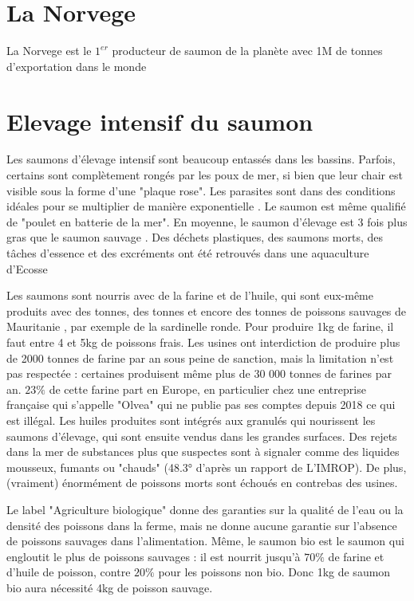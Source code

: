 \documentclass{article}
\begin{document}
\section{La Norvege}
La Norvege est le $1^{er}$ producteur de saumon de la planète avec 1M de tonnes d'exportation dans le monde

\section{Elevage intensif du saumon}
Les saumons d'élevage intensif sont beaucoup entassés dans les bassins. Parfois, certains sont complètement rongés par les poux de mer, si bien que leur chair est visible sous la forme d'une "plaque rose".
Les parasites sont dans des conditions idéales pour se multiplier de manière exponentielle \cite{FRANCE24}. Le saumon est même qualifié de "poulet en batterie de la mer".
En moyenne, le saumon d'élevage est 3 fois plus gras que le saumon sauvage \cite{FT2}. Des déchets plastiques, des saumons morts, des tâches d'essence et des excréments ont été retrouvés dans une aquaculture d'Ecosse \cite{FT2}

Les saumons sont nourris avec de la farine et de l'huile, qui sont eux-même produits avec des tonnes, des tonnes et encore des tonnes de poissons sauvages de Mauritanie \cite{ARTE2}, par exemple de la sardinelle ronde.
Pour produire 1kg de farine, il faut entre 4 et 5kg de poissons frais. Les usines ont interdiction de produire plus de 2000 tonnes de farine par an sous peine de sanction, mais la limitation n'est pas respectée : certaines produisent même plus de 30 000 tonnes de farines par an.
$23 \%$ de cette farine part en Europe, en particulier chez une entreprise française qui s'appelle "Olvea" qui ne publie pas ses comptes depuis 2018 ce qui est illégal.
Les huiles produites sont intégrés aux granulés qui nourissent les saumons d'élevage, qui sont ensuite vendus dans les grandes surfaces.
Des rejets dans la mer de substances plus que suspectes sont à signaler comme des liquides mousseux, fumants ou "chauds" (48.3° d'après un rapport de L'IMROP). De plus, (vraiment) énormément de poissons morts sont échoués en contrebas des usines.

Le label "Agriculture biologique" donne des garanties sur la qualité de l'eau ou la densité des poissons dans la ferme, mais ne donne aucune garantie sur l'absence de poissons sauvages dans l'alimentation.
Même, le saumon bio est le saumon qui engloutit le plus de poissons sauvages : il est nourrit jusqu'à $70\%$ de farine et d'huile de poisson, contre $20\%$ pour les poissons non bio. Donc 1kg de saumon bio aura nécessité 4kg de poisson sauvage.
\end{document}
